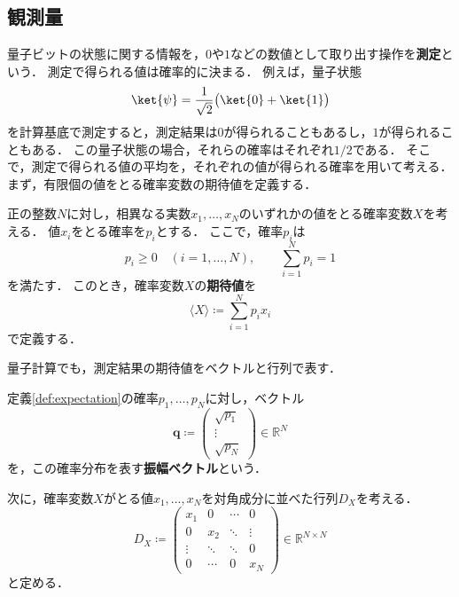 \subsection{観測量}
\label{subsec:observables}

量子ビットの状態に関する情報を，$0$や$1$などの数値として取り出す操作を\textbf{測定}という．
測定で得られる値は確率的に決まる．
例えば，量子状態
\begin{equation*}
  \ket{\psi}=\frac{1}{\sqrt{2}}\bigl(\ket{0}+\ket{1}\bigr)
\end{equation*}
を計算基底で測定すると，測定結果は$0$が得られることもあるし，$1$が得られることもある．
この量子状態の場合，それらの確率はそれぞれ$1/2$である．
そこで，測定で得られる値の平均を，それぞれの値が得られる確率を用いて考える．
まず，有限個の値をとる確率変数の期待値を定義する．

\begin{defi}[期待値]
  \label{def:expectation}
  正の整数$N$に対し，相異なる実数$x_1,\ldots,x_N$のいずれかの値をとる確率変数$X$を考える．
  値$x_i$をとる確率を$p_i$とする．
  ここで，確率$p_i$は
  \begin{equation*}
    p_i\geq 0\quad(i=1,\ldots,N),
    \qquad
    \sum_{i=1}^{N}p_i=1
  \end{equation*}
  を満たす．
  このとき，確率変数$X$の\textbf{期待値}を
  \begin{equation}
    \langle X\rangle\coloneq\sum_{i=1}^{N}p_i x_i
    \label{eq:expectation-finite-distribution}
  \end{equation}
  で定義する．
\end{defi}

量子計算でも，測定結果の期待値をベクトルと行列で表す．

\begin{defi}[振幅ベクトル]
  \label{def:classical-amplitude-vector}
  定義\ref{def:expectation}の確率$p_1,\ldots,p_N$に対し，ベクトル
  \begin{equation}
    \bm{q}\coloneq
    \begin{pmatrix}
      \sqrt{p_1} \\
      \vdots     \\
      \sqrt{p_N}
    \end{pmatrix}
    \in\mathbb R^N
    \label{eq:classical-amplitude-vector}
  \end{equation}
  を，この確率分布を表す\textbf{振幅ベクトル}という．
\end{defi}

次に，確率変数$X$がとる値$x_1,\ldots,x_N$を対角成分に並べた行列$D_X$を考える．
\begin{equation}
  D_X\coloneq
  \begin{pmatrix}
    x_1    & 0      & \cdots & 0      \\
    0      & x_2    & \ddots & \vdots \\
    \vdots & \ddots & \ddots & 0      \\
    0      & \cdots & 0      & x_N
  \end{pmatrix}
  \in\mathbb R^{N\times N}
  \label{eq:classical-observable-diagonal-matrix}
\end{equation}
と定める．

